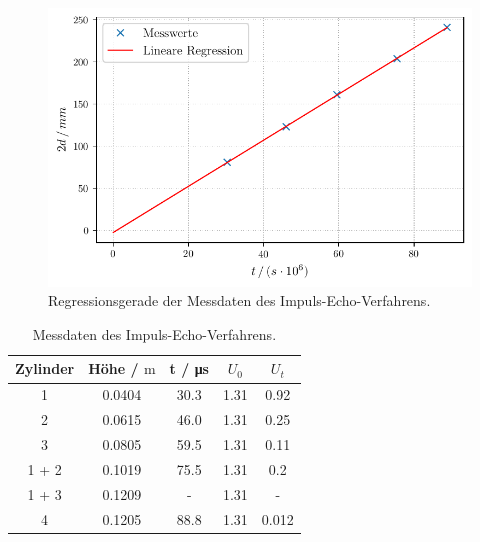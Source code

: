 \begin{figure}
  \centering
  \includegraphics[width = 0.7\linewidth]{build/plot1.pdf}
  \caption{Regressionsgerade der Messdaten des Impuls-Echo-Verfahrens.}
  \label{fig:plot1}
\end{figure}

\begin{table}
  \centering
  \caption{Messdaten des Impuls-Echo-Verfahrens.}
  \label{tab:echo_messungen}
  \begin{tabular}{c | c c c c}
      \toprule
      Zylinder& Höhe / $\unit\meter$ & t / \unit{\micro\second} & $U_0$ & $U_t$\\ 
      \midrule
      1     & 0.0404 & 30.3 & 1.31 & 0.92 \\
      2     & 0.0615 & 46.0 & 1.31 & 0.25 \\
      3     & 0.0805 & 59.5 & 1.31 & 0.11 \\
      1 + 2 & 0.1019 & 75.5 & 1.31 & 0.2  \\
      1 + 3 & 0.1209 &  -   & 1.31 & -    \\
      4     & 0.1205 & 88.8 & 1.31 & 0.012\\
      \bottomrule
  \end{tabular}
\end{table}

